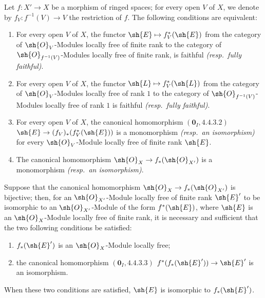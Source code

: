 \begin{lemma}[21.13.2]
\label{IV.21.13.2}
Let $f:X'\to X$ be a morphism of ringed spaces; for every open $V$ of $X$, we denote by $f_V:f^{-1}(V)\to V$ the restriction of $f$.
The following conditions are equivalent:
\begin{enumerate}
  \item[a)] For every open $V$ of $X$, the functor $\sh{E}\mapsto f_V^*(\sh{E})$ from the category of $\sh{O}_V$-Modules locally free of finite rank to the category of $\sh{O}_{f^{-1}(V)}$-Modules locally free of finite rank, is faithful \emph{(resp.\ fully faithful)}.
  \item[a${}'$)] For every open $V$ of $X$, the functor $\sh{L}\mapsto f_V^*(\sh{L})$ from the category of $\sh{O}_V$-Modules locally free of rank $1$ to the category of $\sh{O}_{f^{-1}(V)}$-Modules locally free of rank $1$ is faithful \emph{(resp.\ fully faithful)}.
  \item[b)] For every open $V$ of $X$, the canonical homomorphism $(\mathbf{0}_I, 4.4.3.2)$ $\sh{E}\to(f_V)_*(f_V^*(\sh{E}))$ is a monomorphism \emph{(resp.\ an isomorphism)} for every $\sh{O}_V$-Module locally free of finite rank $\sh{E}$.
  \item[b${}'$)] The canonical homomorphism $\sh{O}_X\to f_*(\sh{O}_{X'})$ is a monomorphism \emph{(resp.\ an isomorphism)}.
\end{enumerate}

Suppose that the canonical homomorphism $\sh{O}_X\to f_*(\sh{O}_{X'})$ is bijective; then, for an $\sh{O}_{X'}$-Module locally free of finite rank $\sh{E}'$ to be isomorphic to an $\sh{O}_{X'}$-Module of the form $f^*(\sh{E})$, where $\sh{E}$ is an $\sh{O}_X$-Module locally free of finite rank, it is necessary and sufficient that the two following conditions be satisfied:
\begin{enumerate}
  \item[(i)] $f_*(\sh{E}')$ is an $\sh{O}_X$-Module locally free;
  \item[(ii)] the canonical homomorphism $(\mathbf{0}_I, 4.4.3.3)$ $f^*(f_*(\sh{E}'))\to\sh{E}'$ is an isomorphism.
\end{enumerate}
When these two conditions are satisfied, $\sh{E}$ is isomorphic to $f_*(\sh{E}')$.
\end{lemma}


